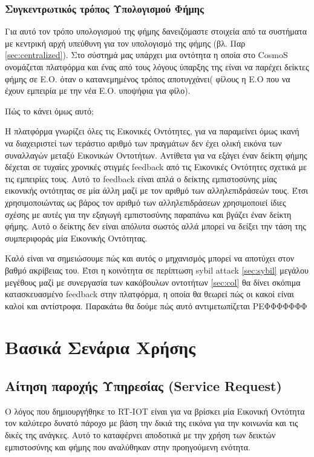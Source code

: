 \subsubsection{Συγκεντρωτικός τρόπος Υπολογισμού Φήμης}

Για αυτό τον τρόπο υπολογισμού της φήμης δανειζόμαστε στοιχεία από τα συστήματα με κεντρική αρχή υπεύθυνη για τον υπολογισμό της φήμης (βλ. Παρ \ref{sec:centralized}). Στο σύστημά μας υπάρχει μια οντότητα η οποία στο CosmoS ονομάζεται πλατφόρμα και ένας από τους λόγους ύπαρξης της είναι να παρέχει δείκτες φήμης σε Ε.Ο. όταν ο κατανεμημένος τρόπος αποτυγχάνει( φίλους η Ε.Ο που να έχουν εμπειρία με την νέα Ε.Ο. υποψήφια για φίλο).

Πώς το κάνει όμως αυτό;

Η πλατφόρμα γνωρίζει όλες τις Εικονικές Οντότητες, για να παραμείνει όμως ικανή να διαχειριστεί των τεράστιο αριθμό των πραγμάτων δεν έχει ολική εικόνα των συναλλαγών μεταξύ Εικονικών Οντοτήτων. Αντίθετα για να εξάγει έναν δείκτη φήμης δέχεται σε τυχαίες χρονικές στιγμές feedback από τις Εικονικές Οντότητες σχετικά με τις εμπειρίες τους. Αυτό το feedback είναι απλά ο δείκτης εμπιστοσύνης μίας εικονικής οντότητας σε μία άλλη μαζί με τον αριθμό των αλληλεπιδράσεών τους. Έτσι χρησιμοποιώντας ως βάρος τον αριθμό των αλληλεπιδράσεων χρησιμοποιεί ίδιες σχέσης με αυτές για την εξαγωγή εμπιστοσύνης παραπάνω και βγάζει έναν δείκτη φήμης. Αυτό ο δείκτης δεν είναι απόλυτα σωστός αλλά μπορεί να δείξει την τάση της συμπεριφοράς μία Εικονικής Οντότητας.

Καλό είναι να σημειώσουμε πώς και αυτός ο μηχανισμός μπορεί να αποτύχει στον βαθμό ακρίβειας του. Έτσι η κοινότητα σε περίπτωση sybil attack \ref{sec:sybil} μεγάλου μεγέθους μαζί με συνεργασία των κακόβουλων οντοτήτων \ref{sec:col} θα δίνει σκόπιμα κατασκευασμένο feedback στην πλατφόρμα, η οποία θα θεωρεί πώς οι κακοί είναι καλοί και αντίστροφα. Παρακάτω θα δούμε πώς αυτό αντιμετωπίζεται ΡΕΦΦΦΦΦΦΦ %
\newpage
\section{Βασικά Σενάρια Χρήσης}

\subsection{Αίτηση παροχής Υπηρεσίας (Service Request)}\label{sec:ser_req}

Ο λόγος που δημιουργήθηκε το RT-IOT είναι για να βρίσκει μία Εικονική Οντότητα τον καλύτερο δυνατό πάροχο με βάση την δικιά της εικόνα για την κοινωνία και τις δικές της ανάγκες. Αυτό το καταφέρνει αποδοτικά με την χρήση των δεικτών εμπιστοσύνης και φήμης που αναλύθηκαν στην προηγούμενη ενότητα.

